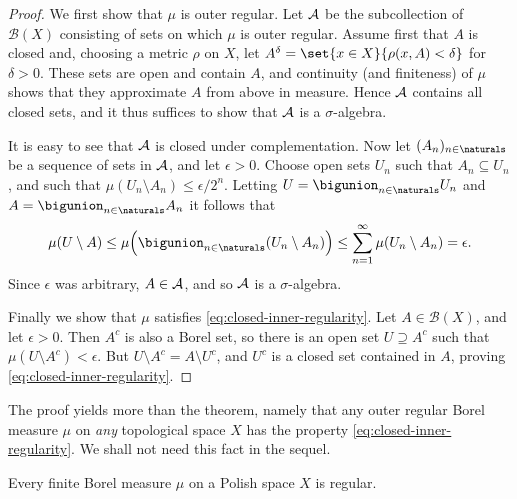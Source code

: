 \documentclass[article, a4paper, 11pt, oneside]{memoir}
\numberwithin{equation}{chapter}
\newcommand{\calB}{\mathcal{B}}
\newcommand{\borel}[1]{\calB(#1)}
\begin{document}
\begin{proof}
    We first show that $\mu$ is outer regular. Let $\mathcal{A}$ be the subcollection of $\borel{X}$ consisting of sets on which $\mu$ is outer regular. Assume first that $A$ is closed and, choosing a metric $\rho$ on $X$, let $A^\delta = \set{x \in X}{\rho(x,A) < \delta}$ for $\delta > 0$. These sets are open and contain $A$, and continuity (and finiteness) of $\mu$ shows that they approximate $A$ from above in measure. Hence $\mathcal{A}$ contains all closed sets, and it thus suffices to show that $\mathcal{A}$ is a $\sigma$-algebra.

    It is easy to see that $\mathcal{A}$ is closed under complementation. Now let $(A_n)_{n \in \naturals}$ be a sequence of sets in $\mathcal{A}$, and let $\epsilon > 0$. Choose open sets $U_n$ such that $A_n \subseteq U_n$, and such that $\mu(U_n \setminus A_n) \leq \epsilon/2^n$. Letting $U = \bigunion_{n \in \naturals} U_n$ and $A = \bigunion_{n \in \naturals} A_n$ it follows that
    \begin{equation*}
        \mu(U \setminus A)
            \leq \mu \Bigl( \bigunion_{n \in \naturals} (U_n \setminus A_n) \Bigr)
            \leq \sum_{n=1}^\infty \mu(U_n \setminus A_n)
            = \epsilon.
    \end{equation*}
    Since $\epsilon$ was arbitrary, $A \in \mathcal{A}$, and so $\mathcal{A}$ is a $\sigma$-algebra.

    Finally we show that $\mu$ satisfies \eqref{eq:closed-inner-regularity}. Let $A \in \borel{X}$, and let $\epsilon > 0$. Then $A^c$ is also a Borel set, so there is an open set $U \supseteq A^c$ such that $\mu(U \setminus A^c) < \epsilon$. But $U \setminus A^c = A \setminus U^c$, and $U^c$ is a closed set contained in $A$, proving \eqref{eq:closed-inner-regularity}.
\end{proof}
%
The proof yields more than the theorem, namely that any outer regular Borel measure $\mu$ on \emph{any} topological space $X$ has the property \eqref{eq:closed-inner-regularity}. We shall not need this fact in the sequel.


\begin{lemma}
    Every finite Borel measure $\mu$ on a Polish space $X$ is regular.
\end{lemma}
\end{document}
